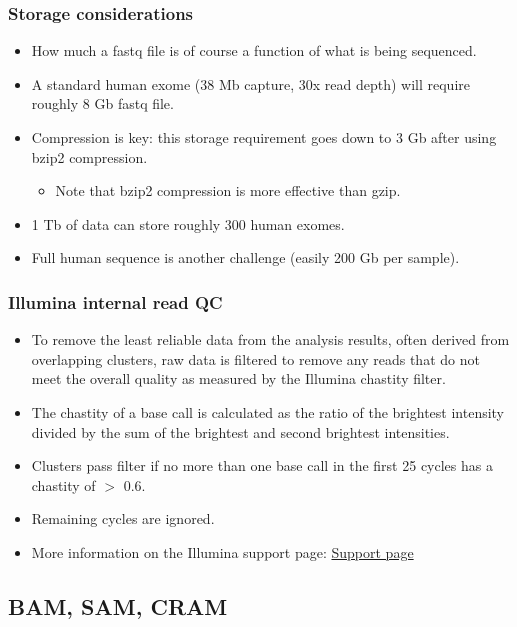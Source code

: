 \documentclass{beamer}
\begin{document}
\begin{frame}
  \frametitle{Storage considerations}
  \begin{itemize}
  \item How much a fastq file is of course a function of what is being sequenced.
  \item A standard human exome (38 Mb capture, 30x read depth) will require roughly 8 Gb fastq file.
  \item Compression is key: this storage requirement goes down to 3 Gb after using bzip2 compression.
    \begin{itemize}
    \item Note that bzip2 compression is more effective than gzip.
    \end{itemize}
  \item 1 Tb of data can store roughly 300 human exomes.
  \item Full human sequence is another challenge (easily 200 Gb per sample).
  \end{itemize}
\end{frame}


\begin{frame}
  \frametitle{Illumina internal read QC}
  \begin{itemize}
  \item To remove the least reliable data from the analysis results, often derived from overlapping clusters, raw data is filtered to remove any reads that do not meet the overall quality as measured by the Illumina chastity filter. 
  \item The chastity of a base call is calculated as the ratio of the brightest intensity divided by the sum of the brightest and second brightest intensities.
  \item Clusters pass filter if no more than one base call in the first 25 cycles has a chastity of $>$ 0.6.
  \item Remaining cycles are ignored.
  \item More information on the Illumina support page: \href{http://support.illumina.com/sequencing/sequencing_software/real-time_analysis_rta/questions.ilmn}{Support page}
  \end{itemize}
\end{frame}


\subsection{BAM, SAM, CRAM}
\end{document}

